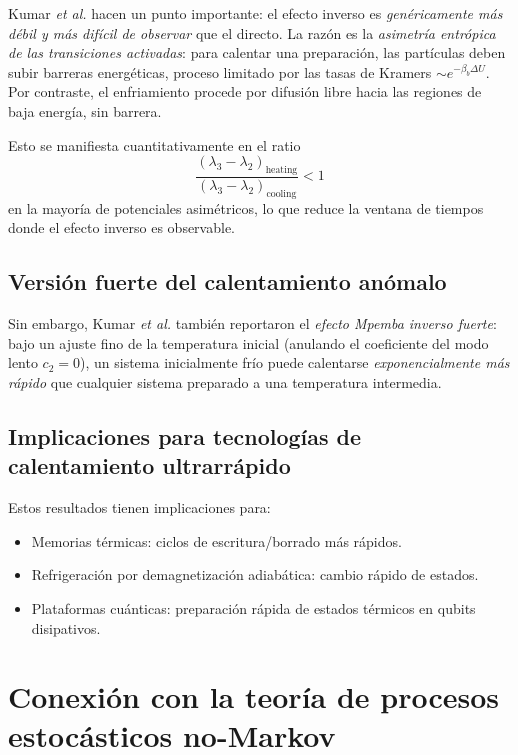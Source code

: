 Kumar \emph{et al.} hacen un punto importante: el efecto inverso es 
\emph{genéricamente más débil y más difícil de observar} que el directo. La 
razón es la \emph{asimetría entrópica de las transiciones activadas}: para 
calentar una preparación, las partículas deben subir barreras energéticas, 
proceso limitado por las tasas de Kramers $\sim e^{-\beta_b \Delta U}$. Por 
contraste, el enfriamiento procede por difusión libre hacia las regiones de baja 
energía, sin barrera.

Esto se manifiesta cuantitativamente en el ratio
\begin{equation}
    \frac{(\lambda_3 - \lambda_2)_{\mathrm{heating}}}{(\lambda_3 - \lambda_2)_{\mathrm{cooling}}} < 1
\end{equation}
%
en la mayoría de potenciales asimétricos, lo que reduce la ventana de tiempos 
donde el efecto inverso es observable.

\subsection{Versión fuerte del calentamiento anómalo}

Sin embargo, Kumar \emph{et al.} también reportaron el \emph{efecto Mpemba 
inverso fuerte}: bajo un ajuste fino de la temperatura inicial (anulando el 
coeficiente del modo lento $c_2 = 0$), un sistema inicialmente frío puede 
calentarse \emph{exponencialmente más rápido} que cualquier sistema preparado a 
una temperatura intermedia.

\subsection{Implicaciones para tecnologías de calentamiento ultrarrápido}

Estos resultados tienen implicaciones para:
\begin{itemize}
\item Memorias térmicas: ciclos de escritura/borrado más rápidos.
\item Refrigeración por demagnetización adiabática: cambio rápido de estados.
\item Plataformas cuánticas: preparación rápida de estados térmicos en qubits 
disipativos.
\end{itemize}

\section{Conexión con la teoría de procesos estocásticos no-Markov}

